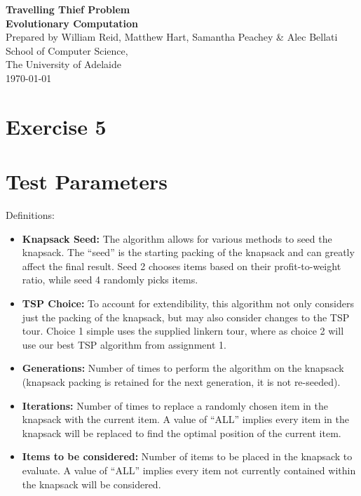 \documentclass[a4paper,12pt]{article}
\begin{document}
\begin{center}
{\LARGE\bf Travelling Thief Problem}\\
\vspace{0.5cm}
{\Large\bf Evolutionary Computation}\\
\vspace{1cm}
Prepared by William Reid, Matthew Hart, Samantha Peachey \& Alec Bellati\\
\vspace{1cm}
School of Computer Science,\\
The University of Adelaide\\
\vspace{1cm}
\today
\end{center}

\vspace{1cm}
\section*{Exercise 5}


\newpage
\section{Test Parameters}
Definitions:
\begin{itemize}
	\item {\bf Knapsack Seed:} The algorithm allows for various methods to seed the knapsack. The ``seed'' is the starting packing of the knapsack and can greatly affect the final result. Seed 2 chooses items based on their profit-to-weight ratio, while seed 4 randomly picks items.
	\item {\bf TSP Choice:} To account for extendibility, this algorithm not only considers just the packing of the knapsack, but may also consider changes to the TSP tour. Choice 1 simple uses the supplied linkern tour, where as choice 2 will use our best TSP algorithm from assignment 1.
	\item {\bf Generations:} Number of times to perform the algorithm on the knapsack (knapsack packing is retained for the next generation, it is not re-seeded).
	\item {\bf Iterations:} Number of times to replace a randomly chosen item in the knapsack with the current item. A value of ``ALL'' implies every item in the knapsack will be replaced to find the optimal position of the current item.
	\item {\bf Items to be considered:} Number of items to be placed in the knapsack to evaluate. A value of ``ALL'' implies every item not currently contained within the knapsack will be considered.
\end{itemize}
\end{document}
